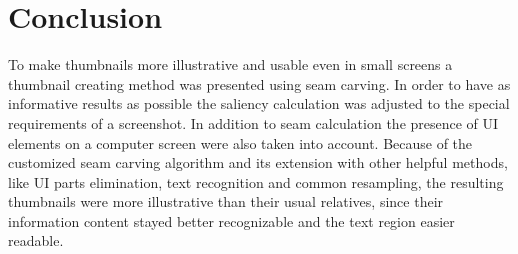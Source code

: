 \documentclass[draft,final]{vutinfth} %
\begin{document}
	\chapter{Conclusion}
	To make thumbnails more illustrative and usable even in small screens a thumbnail creating method was presented using seam carving.
	In order to have as informative results as possible the saliency calculation was adjusted to the special requirements of a screenshot.
	In addition to seam calculation the presence of UI elements on a computer screen were also taken into account.
	Because of the customized seam carving algorithm and its extension with other helpful methods, like UI parts elimination, text recognition and common resampling, the resulting thumbnails were more illustrative than their usual relatives, since their information content stayed better recognizable and the text region easier readable. 
	
	
	\backmatter
	
	\listoffigures %
	
	\cleardoublepage %
	\listoftables %
	
	\listofalgorithms
	
	\printindex
	
	\printglossaries
	
	
	
	
\end{document}
